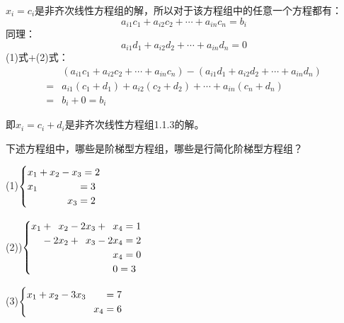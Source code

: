 \documentclass[a4paper]{report}
\begin{document}
\begin{zhengming}
$x_i = c_i$是非齐次线性方程组的解，所以对于该方程组中的任意一个方程都有：
\begin{equation*}
a_{i1}c_{1}+a_{i2}c_{2}+\cdots+a_{in}c_{n}=b_i\tag{1}
\end{equation*}
同理：
\begin{equation*}
a_{i1}d_{1}+a_{i2}d_{2}+\cdots+a_{in}d_{n}=0\tag{2}
\end{equation*}
(1)式+(2)式：
\begin{align*}
&(a_{i1}c_{1}+a_{i2}c_{2}+\cdots+a_{in}c_{n})-(a_{i1}d_{1}+a_{i2}d_{2}+\cdots+a_{in}d_{n})\\
=&a_{i1}(c_{1}+d_{1})+a_{i2}(c_{2}+d_{2})+\cdots+a_{in}(c_{n}+d_{n})\\
=&b_i + 0 =b_i
\end{align*}

即$x_i=c_i+d_i$是非齐次线性方程组1.1.3的解。
\end{zhengming}

\EX 下述方程组中，哪些是阶梯型方程组，哪些是行简化阶梯型方程组？

(1)$
\begin{cases}
x_1+x_2-x_3=2\\
x_1\hphantom{+x_2-x_3}=3\\
\hphantom{x_1+x_2-}x_3=2
\end{cases}
$

(2))$
\begin{cases}
x_1+\hphantom{2} x_2-2x_3+\hphantom{2}x_4=1\\
\hphantom{x_1}-2x_2+\hphantom{2}x_3-2x_4=2\\
\hphantom{x_1-2x_2+2x_3-2}x_4=0\\
\hphantom{x_1-2x_2+2x_3-2}0=3
\end{cases}
$

(3)$
\begin{cases}
x_1 + x_2 - 3x_3 \hphantom{+ x_4}= 7\\
\hphantom{x_1 + x_2 - 3x_3 + }x_4= 6
\end{cases}
$
\end{document}
